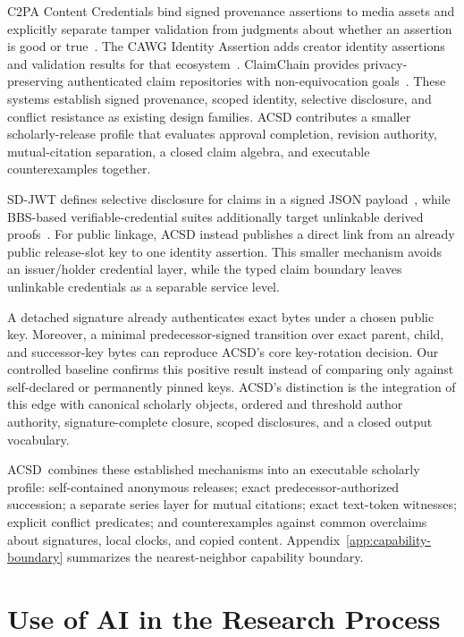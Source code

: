 \documentclass[acmsmall,screen,review,nonacm]{acmart}
\newcommand{\acsd}{\textsc{ACSD}}
\begin{document}
C2PA Content Credentials bind signed provenance assertions to media assets and
explicitly separate tamper validation from judgments about whether an assertion
is good or true~\cite{c2pa}. The CAWG Identity Assertion adds creator identity
assertions and validation results for that ecosystem~\cite{cawg}. ClaimChain
provides privacy-preserving authenticated claim repositories with
non-equivocation goals~\cite{claimchain}. These systems establish signed
provenance, scoped identity, selective disclosure, and conflict resistance as
existing design families. ACSD contributes a smaller scholarly-release profile
that evaluates approval completion, revision authority, mutual-citation
separation, a closed claim algebra, and executable counterexamples together.

SD-JWT defines selective disclosure for claims in a signed JSON payload~\cite{sdjwt}, while BBS-based verifiable-credential suites additionally target unlinkable derived proofs~\cite{bbs}. For public linkage, ACSD instead publishes a direct link from an already public release-slot key to one identity assertion. This smaller mechanism avoids an issuer/holder credential layer, while the typed claim boundary leaves unlinkable credentials as a separable service level.

A detached signature already authenticates exact bytes under a chosen public
key. Moreover, a minimal predecessor-signed transition over exact parent,
child, and successor-key bytes can reproduce ACSD's core key-rotation decision.
Our controlled baseline confirms this positive result instead of comparing only
against self-declared or permanently pinned keys. ACSD's distinction is the
integration of this edge with canonical scholarly objects, ordered and
threshold author authority, signature-complete closure, scoped disclosures,
and a closed output vocabulary.

\acsd\ combines these established mechanisms into an executable scholarly profile: self-contained anonymous releases; exact predecessor-authorized succession; a separate series layer for mutual citations; exact text-token witnesses; explicit conflict predicates; and counterexamples against common overclaims about signatures, local clocks, and copied content. Appendix~\ref{app:capability-boundary} summarizes the nearest-neighbor capability boundary.

\section{Use of AI in the Research Process}
\label{sec:ai-use}
\end{document}

